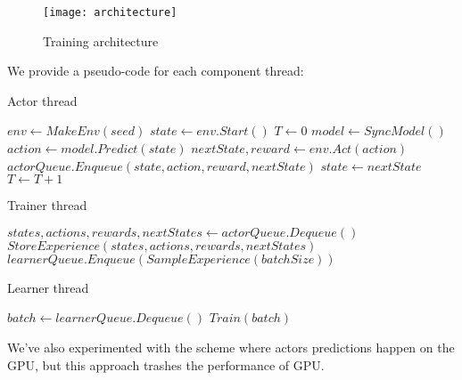 \begin{figure}[h!]
\caption{Training architecture}
\texttt{[image: architecture]}
\end{figure}

We provide a pseudo-code for each component thread:
\begin{algorithm}
    \caption{Actor thread}\label{actor}
    \begin{algorithmic}[1]
        \State $env \gets MakeEnv(seed)$
        \State $state \gets env.Start()$
        \State $T \gets 0$
                \State $model \gets SyncModel()$
            \EndIf
            \State $action \gets model.Predict(state)$
            \State $nextState, reward \gets env.Act(action)$
            \State $actorQueue.Enqueue(state, action, reward, nextState)$
            \State $state \gets nextState$
            \State $T \gets T + 1$
        \EndWhile
    \end{algorithmic}
\end{algorithm}

\begin{algorithm}
    \caption{Trainer thread}\label{trainer}
    \begin{algorithmic}[1]
            \State $states, actions, rewards, nextStates \gets actorQueue.Dequeue()$
            \State $StoreExperience(states, actions, rewards, nextStates)$
            \State $learnerQueue.Enqueue(SampleExperience(batchSize))$
        \EndWhile
    \end{algorithmic}
\end{algorithm}

\begin{algorithm}
    \caption{Learner thread}\label{learner}
    \begin{algorithmic}[1]
            \State $batch \gets learnerQueue.Dequeue()$
            \State $Train(batch)$
        \EndFor
    \end{algorithmic}
\end{algorithm}

We've also experimented with the scheme where actors predictions happen on the GPU, but this
approach trashes the performance of GPU. %

